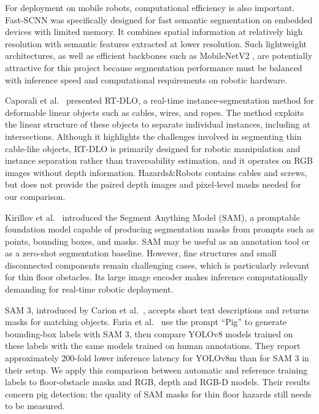 \documentclass[conference]{IEEEtran}
\begin{document}
For deployment on mobile robots, computational efficiency is also
important. Fast-SCNN \cite{poudel2019fast} was specifically designed for
fast semantic segmentation on embedded devices with limited memory. It
combines spatial information at relatively high resolution with semantic
features extracted at lower resolution. Such lightweight architectures,
as well as efficient backbones such as MobileNetV2
\cite{sandler2018mobilenetv2}, are potentially attractive for this
project because segmentation performance must be balanced with inference
speed and computational requirements on robotic hardware.

Caporali et al.~\cite{caporali2023rt} presented RT-DLO, a real-time
instance-segmentation method for deformable linear objects such as
cables, wires, and ropes. The method exploits the linear structure of
these objects to separate individual instances, including at
intersections. Although it highlights the challenges involved in
segmenting thin cable-like objects, RT-DLO is primarily designed for
robotic manipulation and instance separation rather than traversability
estimation, and it operates on RGB images without depth information.
Hazards\&Robots \cite{mantegazza2023hazards} contains cables and screws,
but does not provide the paired depth images and pixel-level masks
needed for our comparison.

Kirillov et al.~\cite{kirillov2023segment} introduced the Segment
Anything Model (SAM), a promptable foundation model capable of producing
segmentation masks from prompts such as points, bounding boxes, and
masks. SAM may be useful as an annotation tool or as a zero-shot
segmentation baseline. However, fine structures and small disconnected
components remain challenging cases, which is particularly relevant for
thin floor obstacles. Its large image encoder makes inference
computationally demanding for real-time robotic deployment.

\newpage

SAM 3, introduced by Carion et al.~\cite{carion2026sam}, accepts short
text descriptions and returns masks for matching objects. Faria et
al.~\cite{faria2026sam3} use the prompt ``Pig'' to generate bounding-box
labels with SAM 3, then compare YOLOv8 models trained on these labels
with the same models trained on human annotations. They report
approximately 200-fold lower inference latency for YOLOv8m than for SAM
3 in their setup. We apply this comparison between automatic and
reference training labels to floor-obstacle masks and RGB, depth and
RGB-D models. Their results concern pig detection; the quality of SAM
masks for thin floor hazards still needs to be measured.
\end{document}
